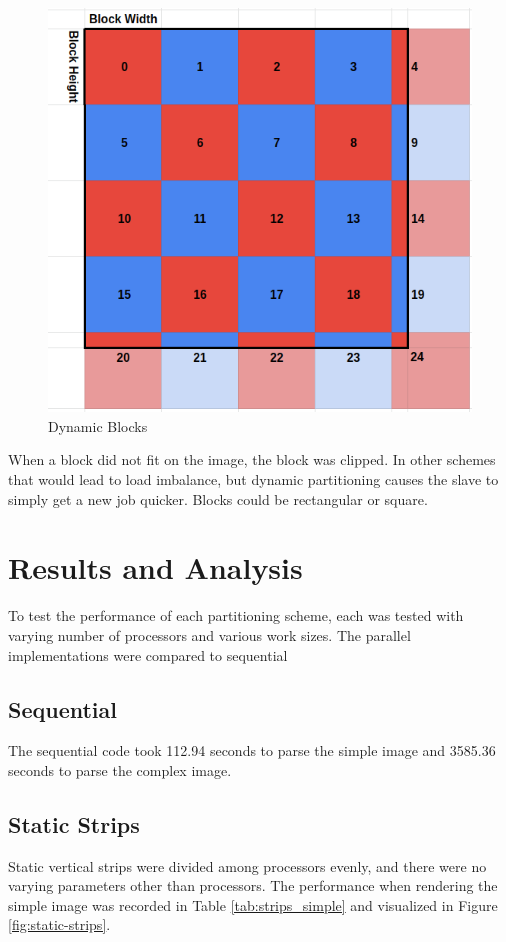 \documentclass[11pt]{article}
\begin{document}
		\begin{figure}[H]
			\centering
			\includegraphics[width=0.7\linewidth]{Pictures/Dynamic}
			\caption{Dynamic Blocks}
			\label{fig:dynamic}
		\end{figure}
	
		When a block did not fit on the image, the block was clipped. In other schemes that would lead to load imbalance, but dynamic partitioning causes the slave to simply get a new job quicker. Blocks could be rectangular or square. 
	
\section{Results and Analysis}

	To test the performance of each partitioning scheme, each was tested with varying number of processors and various work sizes. The parallel implementations were compared to sequential 

	\subsection{Sequential}
		The sequential code took 112.94 seconds to parse the simple image and 3585.36 seconds to parse the complex image. 
		
		
	\subsection{Static Strips}
		
		Static vertical strips were divided among processors evenly, and there were no varying parameters other than processors. The performance when rendering the simple image was recorded in Table \ref{tab:strips_simple} and visualized in Figure \ref{fig:static-strips}.
		
\end{document}
